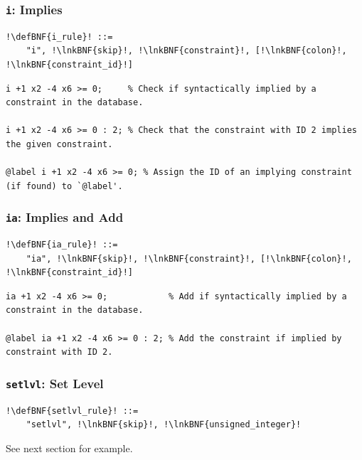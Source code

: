 \documentclass[a4paper]{article}
\newcommand{\defBNF}[1]{\hypertarget{def:#1}{<\detokenize{#1}>}}
\newcommand{\lnkBNF}[1]{\hyperlink{def:#1}{<\detokenize{#1}>}}
\begin{document}
\subsubsection{\texttt{i}: Implies}\label{sec:rules-i}
\begin{lstlisting}
!\defBNF{i_rule}! ::=
	"i", !\lnkBNF{skip}!, !\lnkBNF{constraint}!, [!\lnkBNF{colon}!, !\lnkBNF{constraint_id}!]
\end{lstlisting}
\begin{lstlisting}[language=veripb]
i +1 x2 -4 x6 >= 0;     % Check if syntactically implied by a constraint in the database.

i +1 x2 -4 x6 >= 0 : 2; % Check that the constraint with ID 2 implies the given constraint.

@label i +1 x2 -4 x6 >= 0; % Assign the ID of an implying constraint (if found) to `@label'.
\end{lstlisting}


\subsubsection{\texttt{ia}: Implies and Add}\label{sec:rules-ia}
\begin{lstlisting}
!\defBNF{ia_rule}! ::=
	"ia", !\lnkBNF{skip}!, !\lnkBNF{constraint}!, [!\lnkBNF{colon}!, !\lnkBNF{constraint_id}!]
\end{lstlisting}
\begin{lstlisting}[language=veripb]
ia +1 x2 -4 x6 >= 0;            % Add if syntactically implied by a constraint in the database.

@label ia +1 x2 -4 x6 >= 0 : 2; % Add the constraint if implied by constraint with ID 2.
\end{lstlisting}


\subsubsection{\texttt{setlvl}: Set Level}\label{sec:rules-setlvl}
\begin{lstlisting}
!\defBNF{setlvl_rule}! ::=
	"setlvl", !\lnkBNF{skip}!, !\lnkBNF{unsigned_integer}!
\end{lstlisting}
See next section for example.
\end{document}

